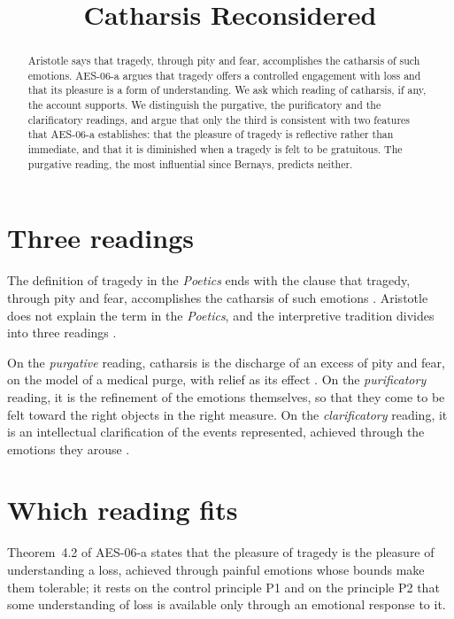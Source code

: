 \documentclass{situationist-preprint}
\title{Catharsis Reconsidered}
\begin{document}
\maketitle

\begin{abstract}
Aristotle says that tragedy, through pity and fear, accomplishes the catharsis of such emotions. AES-06-a argues that tragedy offers a controlled engagement with loss and that its pleasure is a form of understanding. We ask which reading of catharsis, if any, the account supports. We distinguish the purgative, the purificatory and the clarificatory readings, and argue that only the third is consistent with two features that AES-06-a establishes: that the pleasure of tragedy is reflective rather than immediate, and that it is diminished when a tragedy is felt to be gratuitous. The purgative reading, the most influential since Bernays, predicts neither.
\end{abstract}

\section{Three readings}

The definition of tragedy in the \emph{Poetics} ends with the clause that tragedy, through pity and fear, accomplishes the catharsis of such emotions \citep[1449b24--28]{Aristotle}. Aristotle does not explain the term in the \emph{Poetics}, and the interpretive tradition divides into three readings \citep{Halliwell1986}.

\begin{definition}\label{d:readings}
On the \emph{purgative} reading, catharsis is the discharge of an excess of pity and fear, on the model of a medical purge, with relief as its effect \citep{Bernays1857}. On the \emph{purificatory} reading, it is the refinement of the emotions themselves, so that they come to be felt toward the right objects in the right measure. On the \emph{clarificatory} reading, it is an intellectual clarification of the events represented, achieved through the emotions they arouse \citep{Golden1962}.
\end{definition}

\section{Which reading fits}

Theorem~4.2 of AES-06-a states that the pleasure of tragedy is the pleasure of understanding a loss, achieved through painful emotions whose bounds make them tolerable; it rests on the control principle P1 and on the principle P2 that some understanding of loss is available only through an emotional response to it.
\end{document}
